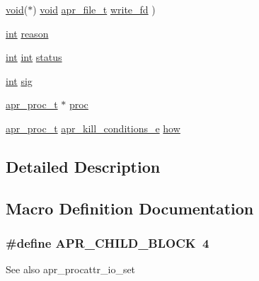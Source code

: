 \begin{DoxyCompactItemize}
\item 
\hyperlink{group__MOD__ISAPI_gacd6cdbf73df3d9eed42fa493d9b621a6}{void}($\ast$) \hyperlink{group__MOD__ISAPI_gacd6cdbf73df3d9eed42fa493d9b621a6}{void} \hyperlink{structapr__file__t}{apr\+\_\+file\+\_\+t} \hyperlink{group__apr__thread__proc_ga2262d56489d6d486af887f01c02fc86e}{write\+\_\+fd} )
\item 
\hyperlink{pcre_8txt_a42dfa4ff673c82d8efe7144098fbc198}{int} \hyperlink{group__apr__thread__proc_gabf19fa5e55c24b9556075afc7b302bbe}{reason}
\item 
\hyperlink{pcre_8txt_a42dfa4ff673c82d8efe7144098fbc198}{int} \hyperlink{pcre_8txt_a42dfa4ff673c82d8efe7144098fbc198}{int} \hyperlink{group__apr__thread__proc_gae7daf19056dc6ab36e8f2e72e911646d}{status}
\item 
\hyperlink{pcre_8txt_a42dfa4ff673c82d8efe7144098fbc198}{int} \hyperlink{group__apr__thread__proc_ga68be1f65e6d1f2949835d9b6b44bcf8e}{sig}
\item 
\hyperlink{structapr__proc__t}{apr\+\_\+proc\+\_\+t} $\ast$ \hyperlink{group__apr__thread__proc_ga0872b22b4085e3dafcc7002d15b30010}{proc}
\item 
\hyperlink{structapr__proc__t}{apr\+\_\+proc\+\_\+t} \hyperlink{group__apr__thread__proc_ga3eaec78633742e7e0cb9480a21477aff}{apr\+\_\+kill\+\_\+conditions\+\_\+e} \hyperlink{group__apr__thread__proc_ga6e0837f31f9838d1bc93f4e98184579f}{how}
\end{DoxyCompactItemize}


\subsection{Detailed Description}


\subsection{Macro Definition Documentation}
\subsubsection[{\texorpdfstring{A\+P\+R\+\_\+\+C\+H\+I\+L\+D\+\_\+\+B\+L\+O\+CK}{APR_CHILD_BLOCK}}]{\setlength{\rightskip}{0pt plus 5cm}\#define A\+P\+R\+\_\+\+C\+H\+I\+L\+D\+\_\+\+B\+L\+O\+CK~4}\hypertarget{group__apr__thread__proc_gacad9da4db7a22f46715e50fb8ec1c939}{}\label{group__apr__thread__proc_gacad9da4db7a22f46715e50fb8ec1c939}
\begin{DoxySeeAlso}{See also}
apr\+\_\+procattr\+\_\+io\+\_\+set 
\end{DoxySeeAlso}
